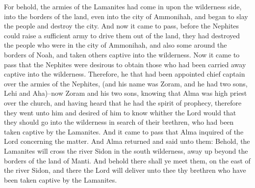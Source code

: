 For behold, the armies of the Lamanites had come in upon the wilderness side, into the borders of the land, even into the city of Ammonihah, and began to slay the people and destroy the city.
\bverse \iffalse And now it came to pass, before the Nephites could raise a sufficient army to drive them out of the land, they had destroyed the people who were in the city of Ammonihah, and also some around the borders of Noah, and taken others captive into the wilderness. \fi
And now it came to pass, before the Nephites could raise a sufficient army to drive them out of the land, they had destroyed the people who were in the city of Ammonihah, and also some around the borders of Noah, and taken others captive into the wilderness.
\bverse \iffalse Now it came to pass that the Nephites were desirous to obtain those who had been carried away captive into the wilderness. \fi
Now it came to pass that the Nephites were desirous to obtain those who had been carried away captive into the wilderness.
\bverse \iffalse Therefore, he that had been appointed chief captain over the armies of the Nephites, (and his name was Zoram, and he had two sons, Lehi and Aha)--now Zoram and his two sons, knowing that Alma was high priest over the church, and having heard that he had the spirit of prophecy, therefore they went unto him and desired of him to know whither the Lord would that they should go into the wilderness in search of their brethren, who had been taken captive by the Lamanites. \fi
Therefore, he that had been appointed chief captain over the armies of the Nephites, (and his name was Zoram, and he had two sons, Lehi and Aha)--now Zoram and his two sons, knowing that Alma was high priest over the church, and having heard that he had the spirit of prophecy, therefore they went unto him and desired of him to know whither the Lord would that they should go into the wilderness in search of their brethren, who had been taken captive by the Lamanites.
\bverse \iffalse And it came to pass that Alma inquired of the Lord concerning the matter. And Alma returned and said unto them: Behold, the Lamanites will cross the river Sidon in the south wilderness, away up beyond the borders of the land of Manti. And behold there shall ye meet them, on the east of the river Sidon, and there the Lord will deliver unto thee thy brethren who have been taken captive by the Lamanites. \fi
And it came to pass that Alma inquired of the Lord concerning the matter. And Alma returned and said unto them: Behold, the Lamanites will cross the river Sidon in the south wilderness, away up beyond the borders of the land of Manti. And behold there shall ye meet them, on the east of the river Sidon, and there the Lord will deliver unto thee thy brethren who have been taken captive by the Lamanites.
